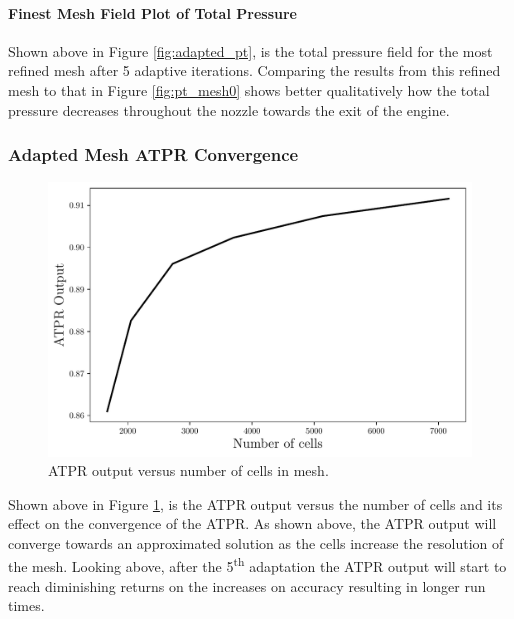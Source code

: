 \paragraph{Finest Mesh Field Plot of Total Pressure} Shown above in Figure \ref{fig:adapted_pt}, is the total pressure field for the most refined mesh after 5 adaptive iterations. Comparing the results from this refined mesh to that in Figure \ref{fig:pt_mesh0} shows better qualitatively how the total pressure decreases throughout the nozzle towards the exit of the engine.

\pagebreak
\subsubsection{Adapted Mesh ATPR Convergence}
\begin{figure}[h]
    \centering
    \includegraphics[width = 0.9\linewidth]{rep/q4/ATPR.pdf}
    \caption[ATPR Convergence with Cell Number]{ATPR output versus number of cells in mesh.}
    \label{fig:adapted_ATPR}
\end{figure}

Shown above in Figure \ref{fig:adapted_ATPR}, is the ATPR output versus the number of cells and its effect on the convergence of the ATPR. As shown above, the ATPR output will converge towards an approximated solution as the cells increase the resolution of the mesh. Looking above, after the 5\textsuperscript{th} adaptation the ATPR output will start to reach diminishing returns on the increases on accuracy resulting in longer run times.

